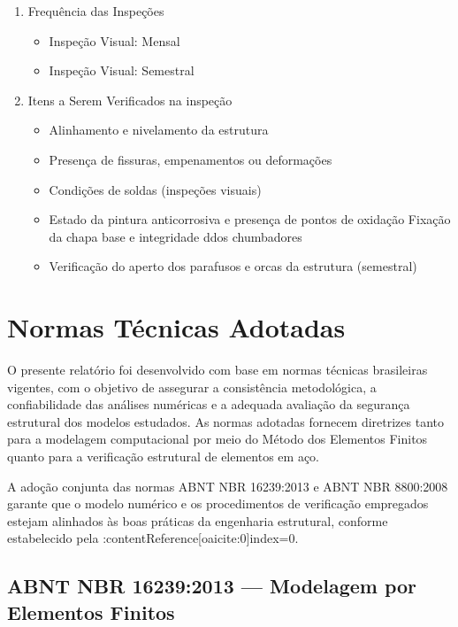 \documentclass[12pt, a4paper]{article}
\begin{document}
\begin{enumerate}[label=\alph*)]
    \item Frequência das Inspeções
    \begin{itemize}
        \item Inspeção Visual: Mensal
        \item Inspeção Visual: Semestral
    \end{itemize}

    \item Itens a Serem Verificados na inspeção
    \begin{itemize}
        \item Alinhamento e nivelamento da estrutura
        \item Presença de fissuras, empenamentos ou deformações
        \item Condições de soldas (inspeções visuais)
        \item Estado da pintura anticorrosiva e presença de pontos de oxidação
        Fixação da chapa base e integridade ddos chumbadores
        \item Verificação do aperto dos parafusos e orcas da estrutura (semestral)
    \end{itemize}
\end{enumerate}

\section{Normas Técnicas Adotadas}

O presente relatório foi desenvolvido com base em normas técnicas brasileiras vigentes, com o objetivo de assegurar a consistência metodológica, a confiabilidade das análises numéricas e a adequada avaliação da segurança estrutural dos modelos estudados. As normas adotadas fornecem diretrizes tanto para a modelagem computacional por meio do Método dos Elementos Finitos quanto para a verificação estrutural de elementos em aço.

A adoção conjunta das normas ABNT NBR 16239:2013 e ABNT NBR 8800:2008 garante que o modelo numérico e os procedimentos de verificação empregados estejam alinhados às boas práticas da engenharia estrutural, conforme estabelecido pela :contentReference[oaicite:0]{index=0}.

\subsection{ABNT NBR 16239:2013 — Modelagem por Elementos Finitos}
\end{document}
